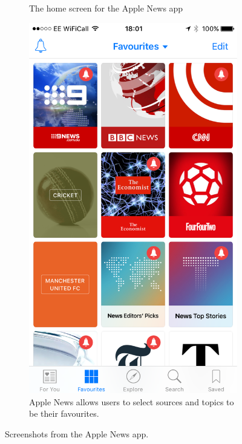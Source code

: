 \documentclass[12pt]{article}
\begin{document}
\begin{figure}[ht!]
\begin{subfigure}[t]{0.3\textwidth}
        \caption{The home screen for the Apple News app}
        \label{AppleHome}
    \end{subfigure}
    \qquad
    \begin{subfigure}[t]{0.3\textwidth}
    \includegraphics[width=\textwidth]{AppleSources.PNG}
   \caption{Apple News allows users to select sources and topics to be their favourites.}
   \label{AppleSources}
   \end{subfigure}
   \caption[Screenshots from the Apple News app]{Screenshots from the Apple News app\cite{appleNews}.}
\end{figure}
\end{document}
